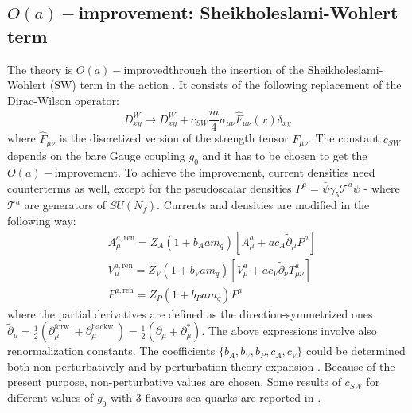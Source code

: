 \documentclass[english, LaM, oneside, noexaminfo]{sapthesis}
\newcommand{\ren}{{\text{ren}}}
\newcommand{\oaid}{$O(a)-$improved}
\newcommand{\oait}{$O(a)-$improvement}
\begin{document}
\subsection{\oait: Sheikholeslami-Wohlert term}\label{subsec:SWterm}
\noindent
The theory is \oaid\space through the insertion of the Sheikholeslami-Wohlert (SW) term in the action \cite{SWterm-Sommer}.
It consists of the following replacement of the Dirac-Wilson operator:
\begin{equation}\label{eq:sw-term}
    D^W_{xy} \longmapsto D^W_{xy} + c_{SW} \frac{ia}{4}\sigma_{\mu\nu}\hat F_{\mu\nu} (x) \delta_{xy}
\end{equation}
where $\hat F_{\mu\nu}$ is the discretized version of the strength tensor $F_{\mu\nu}$.
The constant $c_{SW}$ depends on the bare Gauge coupling $g_0$ and it has to be chosen to get the $O(a)-$improvement.
To achieve the improvement, current densities need counterterms as well, except for the pseudoscalar densities $P^a = \bar \psi \gamma_5 \mathcal{T}^a \psi$ - where $\mathcal{T}^a$ are generators of $SU(N_f)$.
Currents and densities are modified in the following way:
\begin{equation*}
    \begin{aligned}
        & A_\mu^{a,\ren} = Z_A (1+b_A a m_q) \left[ A_\mu^a + ac_A \tilde{\partial}_\mu P^a \right] \\
        & V_\mu^{a,\ren} = Z_V (1+b_V a m_q) \left[ V_\mu^a + ac_V \tilde{\partial}_\nu T^a_{\mu\nu} \right] \\
        & P^{a,\ren} = Z_P (1+b_P a m_q) P^a
    \end{aligned}
\end{equation*}
where the partial derivatives are defined as the direction-symmetrized ones $\tilde{\partial}_\mu = \frac{1}{2}(\partial_\mu^\text{forw.} + \partial_\mu^\text{backw.})=\frac{1}{2}(\partial_\mu + \partial_\mu^*)$.
The above expressions involve also renormalization constants.
The coefficients $\{ b_A, b_V, b_P, c_A, c_V \}$ could be determined both non-perturbatively and by perturbation theory expansion \cite{SWterm-Sommer}.
Because of the present purpose, non-perturbative values are chosen.
Some results of $c_{SW}$ for different values of $g_0$ with 3 flavours sea quarks are reported in \cite{cSW-non-perturbative}.
\end{document}
